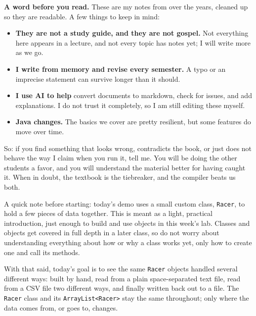 \documentclass[11pt]{article}
\begin{document}

\noindent\textbf{\color{amber}A word before you read.}\enspace
  These are my notes from over the years, cleaned up so they are readable. A few things to
  keep in mind:
 
  \begin{itemize}[leftmargin=1.4em]
    \item \textbf{They are not a study guide, and they are not gospel.} Not everything here
      appears in a lecture, and not every topic has notes yet; I will write more as we go.
    \item \textbf{I write from memory and revise every semester.} A typo or an imprecise
      statement can survive longer than it should.
    \item \textbf{I use AI to help} convert documents to markdown, check for issues, and add
      explanations. I do not trust it completely, so I am still editing these myself.
    \item \textbf{Java changes.} The basics we cover are pretty resilient, but some features
      do move over time.
  \end{itemize}
 
\noindent So: if you find something that looks wrong, contradicts the book, or just
does not behave the way I claim when you run it, tell me. You will be doing the other students
a favor, and you will understand the material better for having caught it. When in doubt, the
textbook is the tiebreaker, and the compiler beats us both.

A quick note before starting: today's demo uses a small custom class,
\texttt{Racer}, to hold a few pieces of data together. This is meant
as a light, practical introduction, just enough to build and use
objects in this week's lab. Classes and objects get covered in full
depth in a later class, so do not worry about understanding everything
about how or why a class works yet, only how to create one and call
its methods.

With that said, today's goal is to see the same \texttt{Racer}
objects handled several different ways: built by hand, read from a
plain space-separated text file, read from a CSV file two different
ways, and finally written back out to a file. The \texttt{Racer}
class and its \texttt{ArrayList<Racer>} stay the same throughout;
only where the data comes from, or goes to, changes.
\end{document}
